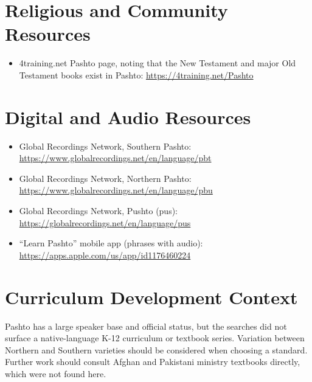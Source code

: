 \documentclass[12pt]{article}
\begin{document}
\section{Religious and Community Resources}
\begin{itemize}
\item 4training.net Pashto page, noting that the New Testament and major Old Testament books exist in Pashto: \url{https://4training.net/Pashto}
\end{itemize}

\section{Digital and Audio Resources}
\begin{itemize}
\item Global Recordings Network, Southern Pashto: \url{https://www.globalrecordings.net/en/language/pbt}
\item Global Recordings Network, Northern Pashto: \url{https://www.globalrecordings.net/en/language/pbu}
\item Global Recordings Network, Pushto (pus): \url{https://globalrecordings.net/en/language/pus}
\item ``Learn Pashto'' mobile app (phrases with audio): \url{https://apps.apple.com/us/app/id1176460224}
\end{itemize}

\section{Curriculum Development Context}
Pashto has a large speaker base and official status, but the searches did not surface a native-language K-12 curriculum or textbook series. Variation between Northern and Southern varieties should be considered when choosing a standard. Further work should consult Afghan and Pakistani ministry textbooks directly, which were not found here.
\end{document}
